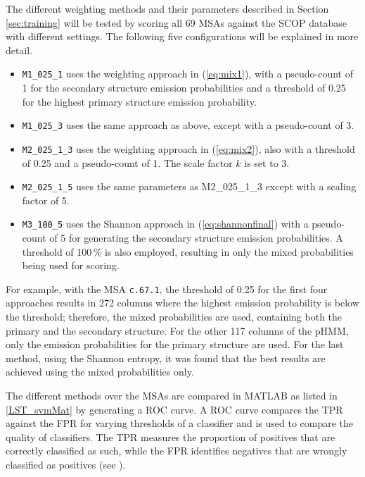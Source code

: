 The different weighting methods and their parameters described in  Section \ref{sec:training} will be tested by scoring all 69 \acp{MSA} against the \ac{SCOP} database with different settings. The following five configurations will be explained in more detail.

\begin{itemize}
\item \texttt{M1\_025\_1} uses the weighting approach in (\ref{eq:mix1}), with a pseudo-count of 1 for the secondary structure emission probabilities and a threshold of 0.25 for the highest primary structure emission probability. 

\item \texttt{M1\_025\_3} uses the same approach as above, except with a pseudo-count of 3.

\item \texttt{M2\_025\_1\_3} uses the weighting approach in (\ref{eq:mix2}), also with a threshold of 0.25 and a pseudo-count of 1. The scale factor $k$ is set to 3. 

\item \texttt{M2\_025\_1\_5} uses the same parameters as M2\_025\_1\_3 except with a scaling factor of 5.

\item \texttt{M3\_100\_5} uses the Shannon approach in (\ref{eq:shannonfinal}) with a pseudo-count of 5 for generating the secondary structure emission probabilities. A threshold of 100\,\% is also employed, resulting in only the mixed probabilities being used for scoring.
\end{itemize}

For example, with the \ac{MSA} \texttt{c.67.1}, the threshold of 0.25 for the first four approaches results in 272 columns where the highest emission probability is below the threshold; therefore, the mixed probabilities are used, containing both the primary and the secondary structure. For the other 117 columns of the \ac{pHMM}, only the emission probabilities for the primary structure are used. For the last method, using the Shannon entropy, it was found that the best results are achieved using the mixed probabilities only.

The different methods over the \acp{MSA} are compared in MATLAB as listed in \ref{LST_svmMat} by generating a \ac{ROC} curve. A \ac{ROC} curve compares the \ac{TPR} against the \ac{FPR} for varying thresholds of a classifier and is used to compare the quality of classifiers. The \ac{TPR} measures the proportion of positives that are correctly classified as such, while the \ac{FPR} identifies negatives that are wrongly classified as positives (see \cite[p. 34--35]{Duda.2001}).

